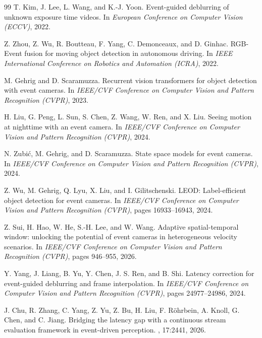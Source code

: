 \documentclass[10pt,twocolumn,letterpaper]{article}
\begin{document}
{\begin{thebibliography}{99}
T. Kim, J. Lee, L. Wang, and K.-J. Yoon.
\newblock Event-guided deblurring of unknown exposure time videos.
\newblock In {\em European Conference on Computer Vision (ECCV)}, 2022.

Z. Zhou, Z. Wu, R. Boutteau, F. Yang, C. Demonceaux, and D. Ginhac.
\newblock RGB-Event fusion for moving object detection in autonomous driving.
\newblock In {\em IEEE International Conference on Robotics and Automation
(ICRA)}, 2022.

M. Gehrig and D. Scaramuzza.
\newblock Recurrent vision transformers for object detection with event cameras.
\newblock In {\em IEEE/CVF Conference on Computer Vision and Pattern Recognition
(CVPR)}, 2023.

H. Liu, G. Peng, L. Sun, S. Chen, Z. Wang, W. Ren, and X. Liu.
\newblock Seeing motion at nighttime with an event camera.
\newblock In {\em IEEE/CVF Conference on Computer Vision and Pattern Recognition
(CVPR)}, 2024.

N. Zubi\'c, M. Gehrig, and D. Scaramuzza.
\newblock State space models for event cameras.
\newblock In {\em IEEE/CVF Conference on Computer Vision and Pattern Recognition
(CVPR)}, 2024.

Z. Wu, M. Gehrig, Q. Lyu, X. Liu, and I. Gilitschenski.
\newblock LEOD: Label-efficient object detection for event cameras.
\newblock In {\em IEEE/CVF Conference on Computer Vision and Pattern Recognition
(CVPR)}, pages 16933--16943, 2024.

Z. Sui, H. Hao, W. He, S.-H. Lee, and W. Wang.
\newblock Adaptive spatial-temporal window: unlocking the potential of event
cameras in heterogeneous velocity scenarios.
\newblock In {\em IEEE/CVF Conference on Computer Vision and Pattern Recognition
(CVPR)}, pages 946--955, 2026.

Y. Yang, J. Liang, B. Yu, Y. Chen, J. S. Ren, and B. Shi.
\newblock Latency correction for event-guided deblurring and frame interpolation.
\newblock In {\em IEEE/CVF Conference on Computer Vision and Pattern Recognition
(CVPR)}, pages 24977--24986, 2024.

J. Chu, R. Zhang, C. Yang, Z. Yu, Z. Bu, H. Liu, F. R\"ohrbein, A. Knoll,
G. Chen, and C. Jiang.
\newblock Bridging the latency gap with a continuous stream evaluation framework
in event-driven perception.
, 17:2441, 2026.


\end{thebibliography}}
\end{document}
